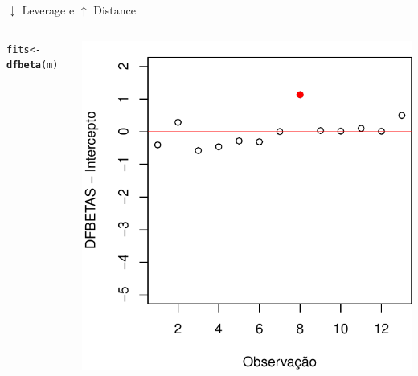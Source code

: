 \documentclass{beamer}\usepackage[]{graphicx}\usepackage[]{color}
\makeatletter
\newcommand{\hlstd}[1]{\textcolor[rgb]{0.345,0.345,0.345}{#1}}%
\newcommand{\hlkwb}[1]{\textcolor[rgb]{0.69,0.353,0.396}{#1}}%
\newcommand{\hlkwd}[1]{\textcolor[rgb]{0.737,0.353,0.396}{\textbf{#1}}}%
\newenvironment{kframe}{%
 \def\at@end@of@kframe{}%
 \ifinner\ifhmode%
  \def\at@end@of@kframe{\end{minipage}}%
  \begin{minipage}{\columnwidth}%
 \fi\fi%
 \def\FrameCommand##1{\hskip\@totalleftmargin \hskip-\fboxsep
 \colorbox{shadecolor}{##1}\hskip-\fboxsep
     \hskip-\linewidth \hskip-\@totalleftmargin \hskip\columnwidth}%
 \MakeFramed {\advance\hsize-\width
   \@totalleftmargin\z@ \linewidth\hsize
   \@setminipage}}%
 {\par\unskip\endMakeFramed%
 \at@end@of@kframe}
\newenvironment{knitrout}{}{} %
\renewenvironment{knitrout}{\setlength{\topsep}{0mm}}{}
\makeatother
\begin{document}
\begin{frame}{$\downarrow$ Leverage e $\uparrow$ Distance}
\begin{columns}[c]
\begin{knitrout}\tiny
{}\color{fgcolor}\begin{kframe}
\begin{alltt}
\hlstd{fits} \hlkwb{<-} \hlkwd{dfbeta}\hlstd{(m)}
\end{alltt}
\end{kframe}
\includegraphics[width=1\linewidth]{figure/inf22-1} 

\end{knitrout}

\end{columns}
\end{frame}
\end{document}
